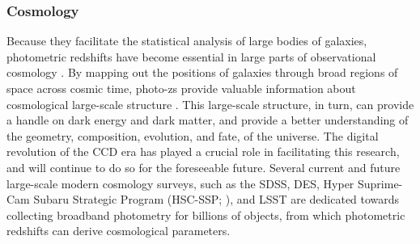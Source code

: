\subsubsection{Cosmology}
Because they facilitate the statistical analysis of large bodies of galaxies, photometric redshifts have become essential in large parts of observational cosmology \citep{2008ApJ...686.1503B}. By mapping out the positions of galaxies through broad regions of space across cosmic time, photo-zs provide valuable information about cosmological large-scale structure \citep{2006ewg3.rept.....P,2007MNRAS.374.1527B,2009ApJ...701...32S,2013PhR...530...87W,2013MNRAS.435.3017D,2018PhRvD..98d3526A,2018PhRvD..98d2006E,2019PASJ...71...43H}. This large-scale structure, in turn, can provide a handle on dark energy and dark matter, and provide a better understanding of the geometry, composition, evolution, and fate, of the universe. The digital revolution of the CCD era has played a crucial role in facilitating this research, and will continue to do so for the foreseeable future. Several current and future large-scale modern cosmology surveys, such as the SDSS, DES, Hyper Suprime-Cam Subaru Strategic Program (HSC-SSP; \citealt{2018PASJ...70S...4A}), and LSST are dedicated towards collecting broadband photometry for billions of objects, from which photometric redshifts can derive cosmological parameters. \par 


